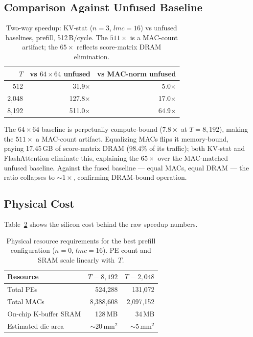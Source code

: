 \documentclass[11pt]{article}
\begin{document}
\subsection{Comparison Against Unfused Baseline}

\begin{table}[H]
\centering
\caption{Two-way speedup: KV-stat ($n{=}3$, $lmc{=}16$) vs unfused baselines,
prefill, 512\,B/cycle. The $511\times$ is a MAC-count artifact; the $65\times$
reflects score-matrix DRAM elimination.}
\label{tab:speedup_3way}
\small
\begin{tabular}{rrr}
\toprule
$T$ & vs $64{\times}64$ unfused & vs MAC-norm unfused \\
\midrule
512   &  31.9$\times$ &  5.0$\times$ \\
2,048 & 127.8$\times$ & 17.0$\times$ \\
8,192 & 511.0$\times$ & 64.9$\times$ \\
\bottomrule
\end{tabular}
\end{table}

The $64{\times}64$ baseline is perpetually compute-bound ($7.8\times$ at
$T{=}8{,}192$), making the $511\times$ a MAC-count artifact.
Equalizing MACs flips it memory-bound, paying 17.45\,GB of score-matrix DRAM
(98.4\% of its traffic); both KV-stat and FlashAttention eliminate this,
explaining the $65\times$ over the MAC-matched unfused baseline.
Against the fused baseline --- equal MACs, equal DRAM --- the ratio collapses to
$\sim\!1\times$, confirming DRAM-bound operation.

\subsection{Physical Cost}

Table~\ref{tab:physical_cost} shows the silicon cost behind the raw speedup numbers.

\begin{table}[H]
\centering
\caption{Physical resource requirements for the best prefill configuration
($n{=}0$, $lmc{=}16$). PE count and SRAM scale linearly with~$T$.}
\label{tab:physical_cost}
\small
\begin{tabular}{lrr}
\toprule
Resource & $T{=}8{,}192$ & $T{=}2{,}048$ \\
\midrule
Total PEs            & 524{,}288  & 131{,}072 \\
Total MACs           & 8{,}388{,}608 & 2{,}097{,}152 \\
On-chip K-buffer SRAM & 128\,MB   & 34\,MB \\
Estimated die area   & $\sim$20\,mm$^2$ & $\sim$5\,mm$^2$ \\
\bottomrule
\end{tabular}
\end{table}
\end{document}

